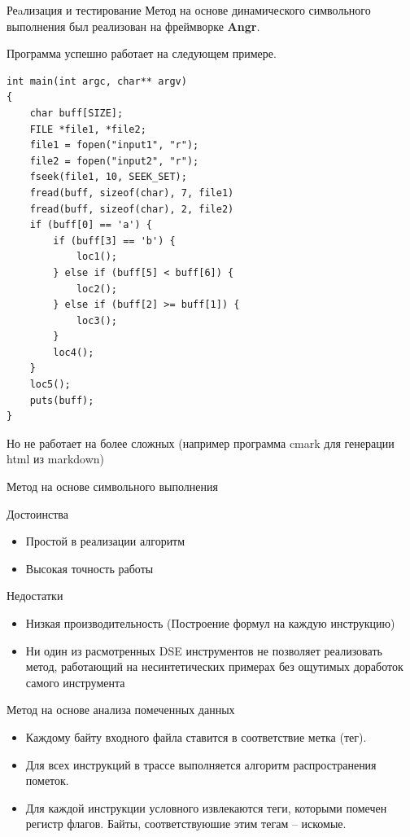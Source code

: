\documentclass[10pt]{beamer}
\begin{document}
\begin{frame}[fragile]{Реaлизация и тестирование}
Метод на основе динамического символьного выполнения был реализован на фреймворке \textbf{Angr}.

Программа успешно работает на следующем примере.
\begin{lstlisting}[basicstyle=\ttfamily\tiny]
int main(int argc, char** argv)
{
    char buff[SIZE];
    FILE *file1, *file2;
    file1 = fopen("input1", "r");
    file2 = fopen("input2", "r");
    fseek(file1, 10, SEEK_SET);
    fread(buff, sizeof(char), 7, file1)
    fread(buff, sizeof(char), 2, file2)
    if (buff[0] == 'a') {
        if (buff[3] == 'b') {
            loc1();
        } else if (buff[5] < buff[6]) {
            loc2();
        } else if (buff[2] >= buff[1]) {
            loc3();
        }
        loc4();
    }
    loc5();
    puts(buff);
}
\end{lstlisting}
Но не работает на более сложных (например программа cmark для генерации html из markdown)

\end{frame}

\begin{frame}{Метод на основе символьного выполнения}

  \begin{block}{Достоинства}
    \begin{itemize}
      \item Простой в реализации алгоритм
      \item Высокая точность работы
    \end{itemize}
  \end{block}
  \pause
  \begin{block}{Недостатки}
    \begin{itemize}
      \item Низкая производительность (Построение формул на каждую инструкцию)
      \item Ни один из расмотренных DSE инструментов не позволяет реализовать метод, работающий на несинтетических примерах без ощутимых доработок самого инструмента
    \end{itemize}
  \end{block}

\end{frame}


\begin{frame}{Метод на основе анализа помеченных данных}

    \begin{itemize}
      \item Каждому байту входного файла ставится в соответствие метка (тег).
      \item Для всех инструкций в трассе выполняется алгоритм распространения пометок.
      \item Для каждой инструкции условного извлекаются теги, которыми помечен регистр флагов. Байты, соответствуюшие этим тегам -- искомые.
    \end{itemize}
\end{frame}
\end{document}
